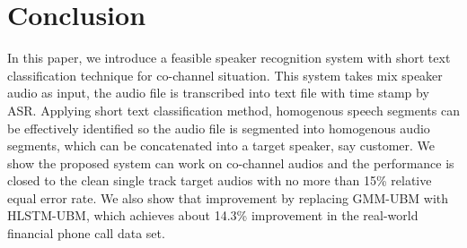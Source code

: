 \section{Conclusion}
\label{sec:conclusion}

In this paper, we introduce a feasible speaker recognition system with short text classification technique for co-channel situation. This system takes mix speaker audio as input, the audio file is transcribed into text file with time stamp by ASR. Applying short text classification method, homogenous speech segments can be effectively identified so the audio file is segmented into homogenous audio segments, which can be concatenated into a target speaker, say customer. We show the proposed system can work on co-channel audios and the performance is closed to the clean single track target audios with no more than 15\% relative equal error rate. We also show that improvement by replacing GMM-UBM with HLSTM-UBM, which achieves about 14.3\% improvement in the real-world financial phone call data set.


